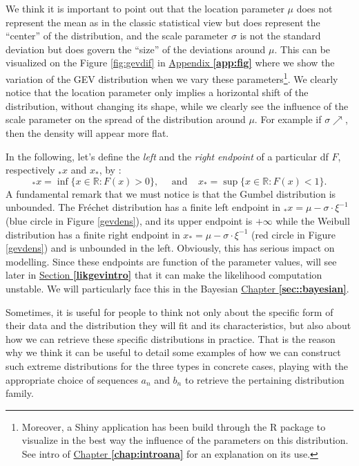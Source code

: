  We think it is important to point out that the location parameter $\mu$ does not represent
the mean as in the classic statistical view but does represent the “center” of the distribution, and the scale parameter
$\sigma$ is not the standard deviation but does govern the “size” of the deviations around $\mu$. This can be visualized on the Figure \ref{fig:gevdif} in \hyperref[app:fig]{Appendix \textbf{\ref{app:fig}}} where we show the variation of the GEV distribution when we vary these parameters\footnote{Moreover, a Shiny application has been build through the R package to visualize in the best way the influence of the parameters on this distribution. See intro of \hyperref[chap:introana]{Chapter \textbf{\ref{chap:introana}}} for an explanation on its use.}. We clearly notice that the location parameter only implies a horizontal shift of the distribution, without changing its shape, while we clearly see the influence of the scale parameter on the spread of the distribution around $\mu$. For example if $\sigma \nearrow$, then the density will appear more flat.  

In the following, let's define the \emph{left} and the \emph{right} \emph{endpoint} of a particular df $F$, respectively $_*x$ and $x_*$, by :
\begin{equation}\label{eq:endpoints}
_*x=\inf\{x\in\mathbb{R}:F(x)>0\}, \ \ \ \ \ \ \text{and} \ \ \ \ \  x_*=\sup\{x\in\mathbb{R}:F(x)<1\}.
\end{equation}
A fundamental remark that we must notice is that the Gumbel distribution is unbounded. The Fréchet distribution has a finite left endpoint in $_*x=\mu-\sigma\cdot\xi^{-1}$ (blue circle in Figure \ref{gevdens}), and its upper endpoint is $+\infty$ while the Weibull distribution has a finite right endpoint in $x_*=\mu-\sigma\cdot\xi^{-1}$ (red circle in Figure \ref{gevdens}) and is unbounded in the left. Obviously, this has serious impact on modelling. Since these endpoints are function of the parameter values, will see later in \hyperref[likgevintro]{Section \textbf{\ref{likgevintro}}} that it can make the likelihood computation unstable. We will particularly face this in the Bayesian \hyperref[sec::bayesian]{Chapter\textbf{ \ref{sec::bayesian}}}.

\vspace{.3cm}
Sometimes, it is useful for people to think not only about the
specific form of their data and the distribution they will fit and its characteristics, but also about how we can retrieve these specific distributions in practice. That is the 
reason why we think it can be useful to detail some examples of how we can construct such extreme distributions for the three types in concrete cases, playing with the appropriate choice of 
sequences $a_n$ and $b_n$ to retrieve the pertaining distribution family.

